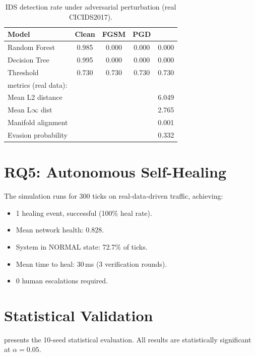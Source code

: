\begin{table}[htbp]
  \centering
  \caption{IDS detection rate under adversarial perturbation (real CICIDS2017).}
  \label{tab:robustness}
  \begin{tabular}{@{} l cccc @{}}
    \toprule
    Model & Clean & FGSM & PGD & \mgae{} \\
    \midrule
    Random Forest & 0.985 & 0.000 & 0.000 & 0.000 \\
    Decision Tree & 0.995 & 0.000 & 0.000 & 0.000 \\
    Threshold     & 0.730 & 0.730 & 0.730 & 0.730 \\
    \midrule
    \multicolumn{4}{l}{\mgae{} metrics (real data):} \\
    \quad Mean L2 distance   & \multicolumn{4}{r}{6.049} \\
    \quad Mean L$\infty$ dist & \multicolumn{4}{r}{2.765} \\
    \quad Manifold alignment  & \multicolumn{4}{r}{0.001} \\
    \quad Evasion probability & \multicolumn{4}{r}{0.332} \\
    \bottomrule
  \end{tabular}
\end{table}

\section{RQ5: Autonomous Self-Healing}

The \arl{} simulation runs for 300 ticks on real-data-driven traffic, achieving:
\begin{itemize}
  \item 1 healing event, successful (100\% heal rate).
  \item Mean network health: $0.828$.
  \item System in NORMAL state: 72.7\% of ticks.
  \item Mean time to heal: 30\,ms (3 verification rounds).
  \item 0 human escalations required.
\end{itemize}

\section{Statistical Validation}

 presents the 10-seed statistical evaluation.
All results are statistically significant at $\alpha = 0.05$.

